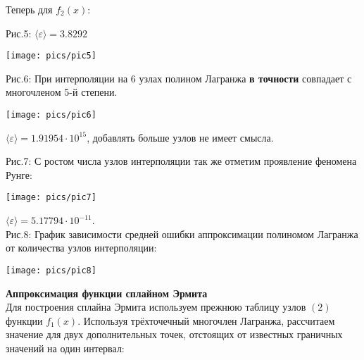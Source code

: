 \documentclass[a4paper, 14pt]{article}
\begin{document}
\newpage
Теперь для $f_2(x)$:\\
{\normalsize Рис.5: $\langle\varepsilon\rangle = 3.8292$
\begin{center}
    \texttt{[image: pics/pic5]}\\
\end{center}}

{\normalsize Рис.6: При интерполяции на 6 узлах полином Лагранжа {\bf в точности} совпадает с многочленом 5-й степени.
    \begin{center}
        \texttt{[image: pics/pic6]}\\
    \end{center}
$\langle\varepsilon\rangle =1.91954\cdot10^{15}$, добавлять больше узлов не имеет смысла.
\newpage


{\normalsize Рис.7: С ростом числа узлов интерполяции так же отметим проявление феномена Рунге:}
\begin{center}
    \texttt{[image: pics/pic7]}\\
\end{center}
\vspace{-0.5cm}
$\langle\varepsilon\rangle=5.17794\cdot10^{-11}$.\\

{\normalsize Рис.8: График зависимости средней ошибки аппроксимации полиномом Лагранжа от количества узлов интерполяции:}
\begin{center}
    \texttt{[image: pics/pic8]}\\
\end{center}
\newpage


{\huge{\textbf{Аппроксимация функции сплайном Эрмита}}}\\
\LARGE Для построения сплайна Эрмита используем прежнюю таблицу узлов $(2)$ функции $f_1(x)$. Используя трёхточечный многочлен Лагранжа, рассчитаем значение для двух дополнительных точек, отстоящих от известных граничных значений на один интервал:

}
\end{document}
